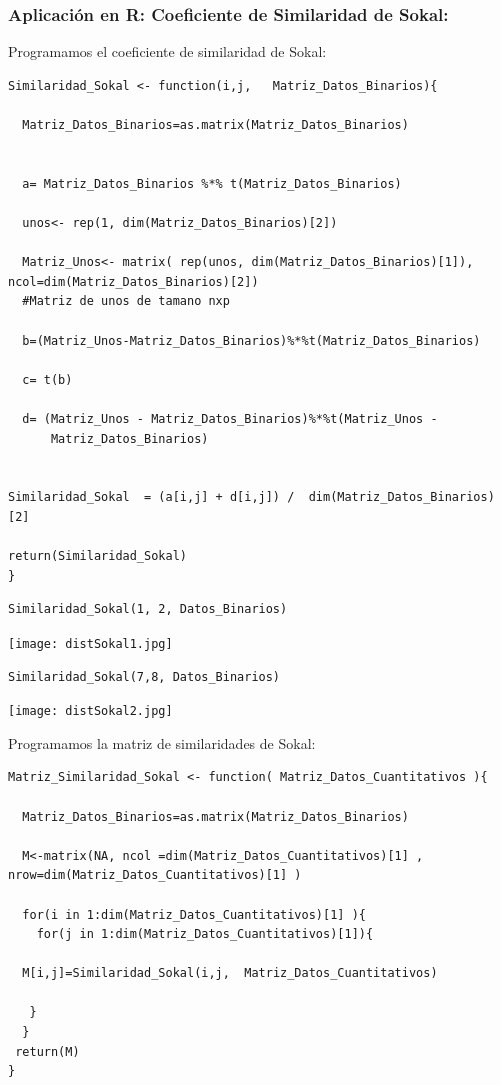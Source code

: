 \documentclass[12pt]{report} %
\begin{document}
\newpage

\subsubsection{Aplicación en R: Coeficiente de Similaridad de Sokal:} 

Programamos el coeficiente de similaridad de Sokal:

\begin{lstlisting}
Similaridad_Sokal <- function(i,j,   Matriz_Datos_Binarios){
  
  Matriz_Datos_Binarios=as.matrix(Matriz_Datos_Binarios)

  
  a= Matriz_Datos_Binarios %*% t(Matriz_Datos_Binarios)
  
  unos<- rep(1, dim(Matriz_Datos_Binarios)[2])

  Matriz_Unos<- matrix( rep(unos, dim(Matriz_Datos_Binarios)[1]), ncol=dim(Matriz_Datos_Binarios)[2]) 
  #Matriz de unos de tamano nxp

  b=(Matriz_Unos-Matriz_Datos_Binarios)%*%t(Matriz_Datos_Binarios)
  
  c= t(b)
  
  d= (Matriz_Unos - Matriz_Datos_Binarios)%*%t(Matriz_Unos -     
      Matriz_Datos_Binarios) 


Similaridad_Sokal  = (a[i,j] + d[i,j]) /  dim(Matriz_Datos_Binarios)[2] 
  
return(Similaridad_Sokal)
}
\end{lstlisting}

\begin{lstlisting}
Similaridad_Sokal(1, 2, Datos_Binarios)
\end{lstlisting}

\texttt{[image: distSokal1.jpg]}

\begin{lstlisting}
Similaridad_Sokal(7,8, Datos_Binarios)
\end{lstlisting}

\texttt{[image: distSokal2.jpg]}

\newpage

Programamos la matriz de similaridades de Sokal:

\begin{lstlisting}
Matriz_Similaridad_Sokal <- function( Matriz_Datos_Cuantitativos ){
  
  Matriz_Datos_Binarios=as.matrix(Matriz_Datos_Binarios)

  M<-matrix(NA, ncol =dim(Matriz_Datos_Cuantitativos)[1] , nrow=dim(Matriz_Datos_Cuantitativos)[1] )
  
  for(i in 1:dim(Matriz_Datos_Cuantitativos)[1] ){
    for(j in 1:dim(Matriz_Datos_Cuantitativos)[1]){
    
  M[i,j]=Similaridad_Sokal(i,j,  Matriz_Datos_Cuantitativos)
  
   }
  }
 return(M)
}
\end{lstlisting}
\end{document}
